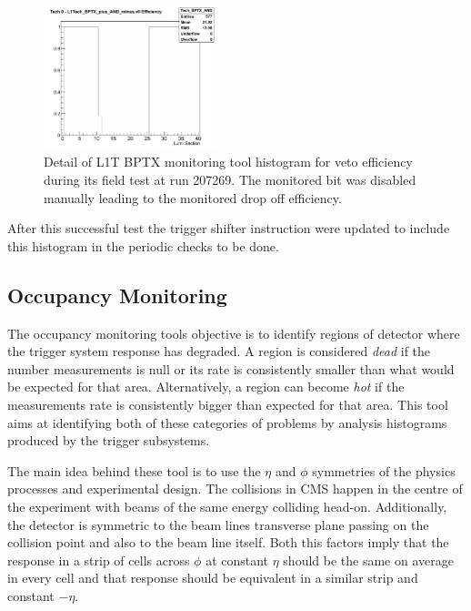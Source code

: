\begin{figure}[!htb]
\centering
\includegraphics[width=0.45\textwidth]{Chapter03/L1TOnline/Images/L1TBPTX_Tech_BPTX_AND.png}
\caption{Detail of \gls{L1T} \gls{BPTX} monitoring tool histogram for veto efficiency during its field test at run 207269. The monitored bit was disabled manually leading to the monitored drop off efficiency.} 
\label{FIGURE:TechnicalWork_L1TBPTX_ImplementationTests}
\end{figure}

After this successful test the trigger shifter instruction were updated to include this histogram in the periodic checks to be done.  

\subsection{Occupancy Monitoring}


The occupancy monitoring tools objective is to identify regions of detector where the trigger system response has degraded. A region is considered \textit{dead} if the number measurements is null or its rate is consistently smaller than what would be expected for that area. Alternatively, a region can become \textit{hot} if the measurements rate is consistently bigger than expected for that area. This tool aims at identifying both of these categories of problems by analysis histograms produced by the trigger subsystems.

The main idea behind these tool is to use the $\eta$ and $\phi$ symmetries of the physics processes and experimental design. The collisions in \gls{CMS} happen in the centre of the experiment with beams of the same energy colliding head-on. Additionally, the detector is symmetric to the beam lines transverse plane passing on the collision point and also to the beam line itself. Both this factors imply that the response in a strip of cells across $\phi$ at constant $\eta$ should be the same on average in every cell and that response should be equivalent in a similar strip and constant $-\eta$.

